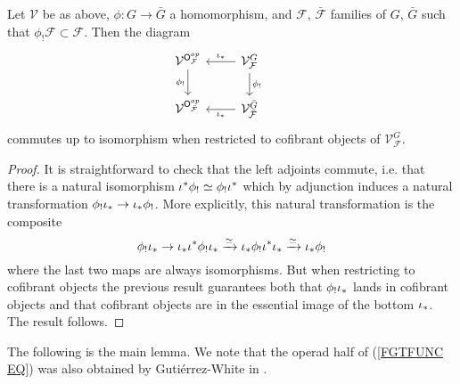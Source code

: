 \documentclass[a4paper,10pt]{article}%
\begin{document}
\begin{corollary}\label{FINALCOR COR}
Let $\mathcal{V}$ be as above, 
$\phi \colon G \to \bar{G}$
a homomorphism, and 
$\mathcal{F}$, $\bar{\mathcal{F}}$
families of $G$, $\bar{G}$
such that $\phi_{!}\mathcal{F} \subset \mathcal{F}$.
Then the diagram
\[
\begin{tikzcd}
	\mathcal{V}^{\mathsf{O}_{\mathcal{F}}^{op}} \ar{d}[swap]{\phi_!} &
	\mathcal{V}^{G}_{\mathcal{F}} \ar{l}[swap]{\iota_{\**}} \ar{d}{\phi_!}&
\\
	\mathcal{V}^{\mathsf{O}_{\mathcal{\bar{F}}}^{op}}  &
	\mathcal{V}^{\bar{G}}_{\mathcal{\bar{F}}} \ar{l}{\iota_{\**}}&
\end{tikzcd}
\]
commutes up to isomorphism when restricted to 
cofibrant objects of $\mathcal{V}^{G}_{\mathcal{F}}$.
\end{corollary}


\begin{proof}
	It is straightforward to check that the left adjoints commute, i.e. that there is a natural isomorphism 
	$\iota^{\**} \phi_{!} \simeq \phi_{!} \iota^{\**}$
which by adjunction induces a natural transformation
	$\phi_! \iota_{\**} \to \iota_{\**} \phi_!$.
More explicitly, this natural transformation is the composite
\[\phi_! \iota_{\**} \to 
\iota_{\**} \iota^{\**} \phi_! \iota_{\**} \xrightarrow{\simeq}
\iota_{\**} \phi_! \iota^{\**} \iota_{\**} \xrightarrow{\simeq}
\iota_{\**} \phi_!
\]
where the last two maps are always isomorphisms. But when restricting to cofibrant objects the previous result guarantees both that $\phi_! \iota_{\**}$ lands in cofibrant objects and that cofibrant objects are in the essential image of the bottom $\iota_{\**}$. The result follows.
\end{proof}

The following is the main lemma. We note that the 
operad half of (\ref{FGTFUNC EQ})
was also obtained by Guti\'{e}rrez-White in \cite{GW17}.
\end{document}
